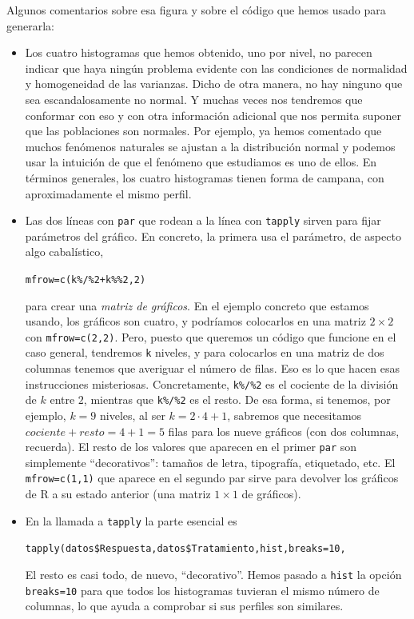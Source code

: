 \documentclass[10pt,a4paper]{article}\usepackage[]{graphicx}\usepackage[]{color}
\begin{document}
Algunos comentarios sobre esa figura y sobre el código que hemos usado para generarla:
\begin{itemize}
  \item Los cuatro histogramas que hemos obtenido, uno por nivel, no parecen indicar que haya ningún problema evidente con las condiciones de normalidad y homogeneidad de las varianzas. Dicho de otra manera, no hay ninguno que sea escandalosamente no normal. Y muchas veces nos tendremos que conformar con eso y con otra información adicional que nos permita suponer que las poblaciones son normales. Por ejemplo, ya hemos comentado que muchos fenómenos naturales se ajustan a la distribución normal y podemos usar la intuición de que el fenómeno que estudiamos es uno de ellos. En términos generales, los cuatro histogramas tienen forma de campana, con aproximadamente el mismo perfil.
  \item Las dos líneas con {\tt par} que rodean a la línea con {\tt tapply} sirven para fijar parámetros del gráfico. En concreto, la primera usa el parámetro, de aspecto algo cabalístico,
      \begin{center}
      \verb#mfrow=c(k%/%2+k%%2,2)#
      \end{center}
      para crear una {\em matriz de gráficos}. En el ejemplo concreto que estamos usando, los gráficos son cuatro, y podríamos colocarlos en una matriz $2\times 2$ con \verb#mfrow=c(2,2)#. Pero, puesto que queremos un código que funcione en el caso general, tendremos {\tt k} niveles, y para colocarlos en una matriz de dos columnas tenemos que averiguar el número de filas. Eso es lo que hacen esas instrucciones misteriosas. Concretamente, \verb#k%/%2# es el cociente de la división de $k$ entre $2$, mientras que  \verb#k%/%2#       es el resto. De esa forma, si tenemos, por ejemplo, $k=9$ niveles, al ser $k=2\cdot 4+1$, sabremos que necesitamos $cociente+resto=4+1=5$ filas para los nueve gráficos (con dos columnas, recuerda). El resto de los valores que aparecen en el primer {\tt par} son simplemente ``decorativos'': tamaños de letra, tipografía, etiquetado, etc. El {\tt mfrow=c(1,1)} que aparece en el segundo par sirve para devolver los gráficos de R a su estado anterior (una matriz $1\times 1$ de gráficos).

  \item En la llamada a {\tt tapply} la parte esencial es
      \begin{center}
      \verb#tapply(datos$Respuesta,datos$Tratamiento,hist,breaks=10,#
      \end{center}
      El resto es casi todo, de nuevo, ``decorativo''. Hemos pasado a {\tt hist} la opción {\tt breaks=10} para que todos los histogramas tuvieran el mismo número de columnas, lo que ayuda a comprobar si sus perfiles son similares.

\end{itemize}
\end{document}
